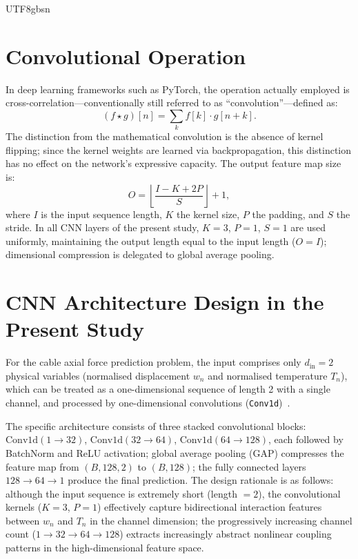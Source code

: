 \documentclass[a4paper,12pt]{report}
\begin{document}
\begin{CJK}{UTF8}{gbsn}
\section{Convolutional Operation}
\label{sec:conv_op}

In deep learning frameworks such as PyTorch, the operation actually employed is
cross-correlation---conventionally still referred to as ``convolution''---defined as:
\begin{equation}
  (f \star g)[n] = \sum_k f[k] \cdot g[n+k].
  \label{eq:cross_correlation}
\end{equation}
The distinction from the mathematical convolution is the absence of kernel flipping;
since the kernel weights are learned via backpropagation, this distinction has no effect
on the network's expressive capacity. The output feature map size is:
\begin{equation}
  O = \left\lfloor \frac{I - K + 2P}{S} \right\rfloor + 1,
  \label{eq:conv_size}
\end{equation}
where $I$ is the input sequence length, $K$ the kernel size, $P$ the padding, and $S$
the stride. In all CNN layers of the present study, $K = 3$, $P = 1$, $S = 1$ are used
uniformly, maintaining the output length equal to the input length ($O = I$); dimensional
compression is delegated to global average pooling.

\section{CNN Architecture Design in the Present Study}
\label{sec:cnn_design}

For the cable axial force prediction problem, the input comprises only $d_{\text{in}} = 2$
physical variables (normalised displacement $w_n$ and normalised temperature $T_n$),
which can be treated as a one-dimensional sequence of length 2 with a single channel,
and processed by one-dimensional convolutions (\texttt{Conv1d})~\cite{kiranyaz2021cnn}.

The specific architecture consists of three stacked convolutional blocks:
$\text{Conv1d}(1 \to 32)$, $\text{Conv1d}(32 \to 64)$, $\text{Conv1d}(64 \to 128)$,
each followed by BatchNorm and ReLU activation; global average pooling (GAP) compresses
the feature map from $(B,128,2)$ to $(B,128)$; the fully connected layers
$128 \to 64 \to 1$ produce the final prediction. The design rationale is as follows:
although the input sequence is extremely short (length $= 2$), the convolutional kernels
($K = 3$, $P = 1$) effectively capture bidirectional interaction features between
$w_n$ and $T_n$ in the channel dimension; the progressively increasing channel count
($1 \to 32 \to 64 \to 128$) extracts increasingly abstract nonlinear coupling patterns
in the high-dimensional feature space.


\end{CJK}
\end{document}
